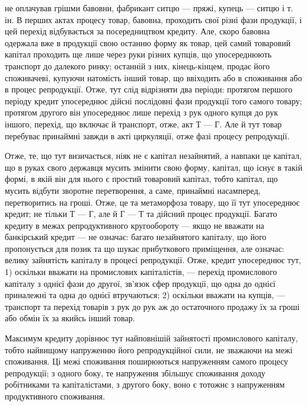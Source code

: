 не оплачував грішми бавовни, фабрикант ситцю — пряжі, купець — ситцю і т. ін.
В перших актах процесу товар, бавовна, проходить свої різні фази продукції, і цей
перехід відбувається за посередництвом кредиту. Але, скоро бавовна одержала
вже в продукції свою останню форму як товар, цей самий товаровий капітал
проходить ще лише через руки різних купців, що упосереднюють транспорт до
далекого ринку; останній з них, кінець-кінцем, продає його споживачеві,
купуючи натомість інший товар, що ввіходить або в споживання або в процес
репродукції. Отже, тут слід відрізняти два періоди: протягом першого періоду
кредит упосереднює дійсні послідовні фази продукції того самого товару; протягом
другого він упосереднює лише перехід з рук одного купця до рук іншого, перехід,
що включає й транспорт, отже, акт Т — Г. Але й тут товар перебуває принаймні
завжди в акті циркуляції, отже фазі процесу репродукції.

Отже, те, що тут визичається, ніяк не є капітал незайнятий, а навпаки це
капітал, що в руках свого державця мусить змінити свою форму, капітал, що
існує в такій формі, в якій він для нього є простий товаровий капітал, тобто
капітал, що мусить відбути зворотне перетворення, а саме, принаймні насамперед,
перетворитись на гроші. Отже, це та метаморфоза товару, що її тут упосереднює
кредит; не тільки Т — Г, але й Г — Т та дійсний процес продукції.
Багато кредиту в межах репродуктивного кругообороту — якщо не вважати на банкірський
кредит — не означає: багато незайнятого капіталу, що його пропонується
для позик та що шукає прибуткового приміщення, але означає: велику
зайнятість капіталу в процесі репродукції. Отже, кредит упосереднює тут,
1) оскільки вважати на промислових капіталістів, — перехід промислового капіталу
з однієї фази до другої, зв’язок сфер продукції, що одна до однієї приналежні
та одна до однієї втручаються; 2) оскільки вважати на купців, —
транспорт та перехід товарів з рук до рук аж до остаточного продажу їх за
гроші або обмін їх за якийсь інший товар.

Максимум кредиту дорівнює тут найповнішій зайнятості промислового капіталу,
тобто найвищому напруженню його репродукційної сили, не зважаючи на межі
споживання. Ці межі споживання поширюються напруженням самого процесу
репродукції; з одного боку, те напруження збільшує споживання доходу робітниками
та капіталістами, з другого боку, воно є тотожнє з напруженням продуктивного
споживання.

